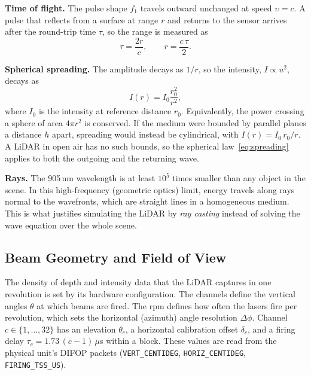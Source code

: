 \documentclass[11pt]{article}
\begin{document}
\textbf{Time of flight.} The pulse shape $f_1$ travels outward unchanged at speed $\upsilon = c$. A pulse that reflects from a surface at range $r$
and returns to the sensor arrives after the round-trip time $\tau$, so the range is measured as
\begin{equation}\label{eq:tof}
    \tau = \frac{2r}{c}, \qquad r = \frac{c\,\tau}{2}.
\end{equation}

\textbf{Spherical spreading.} The amplitude decays as $1/r$, so the intensity, $I \propto u^2$, decays as
\begin{equation}\label{eq:spreading}
    I(r) = I_0 \frac{r_0^2}{r^2},
\end{equation}
where $I_0$ is the intensity at reference distance $r_0$. Equivalently, the power crossing a sphere of area $4\pi r^2$ is conserved.
If the medium were bounded by parallel planes a distance $h$ apart, spreading would instead be cylindrical, with $I(r) = I_0\, r_0 / r$.
A LiDAR in open air has no such bounds, so the spherical law~\eqref{eq:spreading} applies to both the outgoing and the returning wave.

\textbf{Rays.} The 905\,nm wavelength is at least $10^{5}$ times smaller than any object in the scene. In this high-frequency (geometric optics) limit,
energy travels along rays normal to the wavefronts, which are straight lines in a homogeneous medium. This is what justifies simulating the
LiDAR by \emph{ray casting} instead of solving the wave equation over the whole scene.

\subsection{Beam Geometry and Field of View}\label{sec:fov}
The density of depth and intensity data that the LiDAR captures in one revolution is set by its hardware configuration.
The channels define the vertical angles $\theta$ at which beams are fired. The rpm defines how often the lasers fire per revolution,
which sets the horizontal (azimuth) angle resolution $\Delta\phi$. Channel $c \in \{1,\dots,32\}$ has an elevation $\theta_c$, a
horizontal calibration offset $\delta_c$, and a firing delay $\tau_c = 1.73\,(c-1)$\,$\mu$s within a block. These values are read from the
physical unit's DIFOP packets (\texttt{VERT\_CENTIDEG}, \texttt{HORIZ\_CENTIDEG}, \texttt{FIRING\_TSS\_US}).
\end{document}
